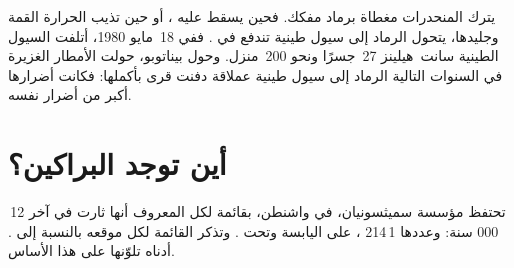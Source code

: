 \begin{remark}\label{rem:g7:volcanoes:mudflows}
يترك  المنحدرات مغطاة برماد مفكك. فحين يسقط عليه ،
أو حين تذيب الحرارة  القمة وجليدها، يتحول الرماد
إلى سيول طينية تندفع في . ففي 18~مايو 1980، أتلفت السيول الطينية
 سانت~هيلينز 27~جسرًا ونحو 200~منزل. وحول
بيناتوبو، حولت الأمطار الغزيرة في السنوات التالية الرماد إلى
سيول طينية عملاقة دفنت قرى بأكملها: فكانت أضرارها أكبر من أضرار
 نفسه.
\end{remark}


\section{أين توجد البراكين؟}

تحتفظ مؤسسة سميثسونيان، في واشنطن، بقائمة لكل
 المعروف أنها ثارت في آخر 12\,000 سنة: وعددها 1\,214 ،
على اليابسة وتحت . وتذكر القائمة لكل  موقعه
بالنسبة إلى .  أدناه تلوّنها على هذا الأساس.

